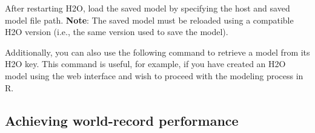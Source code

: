 \waterExampleInR


\waterExampleInPython



\normalsize

\noindent
After restarting  H2O, load the saved model by specifying the host and saved model file path. \textbf{Note}: The saved model must be reloaded using a compatible H2O version (i.e., the same version used to save the model).

\normalsize
\waterExampleInR


\waterExampleInPython



\noindent
Additionally, you can also use the following command to retrieve a model from its H2O key. This command is useful, for example, if you have created an H2O model using the web interface and wish to proceed with the modeling process in R.

\waterExampleInR


\waterExampleInPython




\subsection{Achieving world-record performance}

